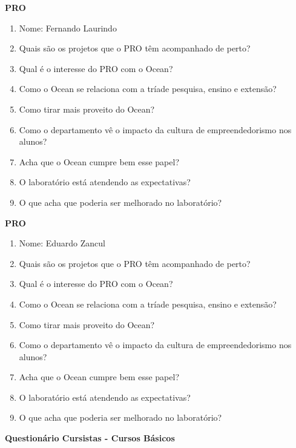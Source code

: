 \begin{anexosenv}
\clearpage

\textbf{PRO}

\begin{enumerate}
\item Nome: Fernando Laurindo
\item Quais são os projetos que o PRO têm acompanhado de perto?
\item Qual é o interesse do PRO com o Ocean?
\item Como o Ocean se relaciona com a tríade pesquisa, ensino e extensão?
\item Como tirar mais proveito do Ocean?
\item Como o departamento vê o impacto da cultura de empreendedorismo nos alunos?
\item Acha que o Ocean cumpre bem esse papel?
\item O laboratório está atendendo as expectativas?
\item O que acha que poderia ser melhorado no laboratório?
\end{enumerate}

\clearpage

\textbf{PRO}

\begin{enumerate}
\item Nome: Eduardo Zancul
\item Quais são os projetos que o PRO têm acompanhado de perto?
\item Qual é o interesse do PRO com o Ocean?
\item Como o Ocean se relaciona com a tríade pesquisa, ensino e extensão?
\item Como tirar mais proveito do Ocean?
\item Como o departamento vê o impacto da cultura de empreendedorismo nos alunos?
\item Acha que o Ocean cumpre bem esse papel?
\item O laboratório está atendendo as expectativas?
\item O que acha que poderia ser melhorado no laboratório?
\end{enumerate}

\clearpage

\textbf{Questionário Cursistas - Cursos Básicos}


\end{anexosenv}
